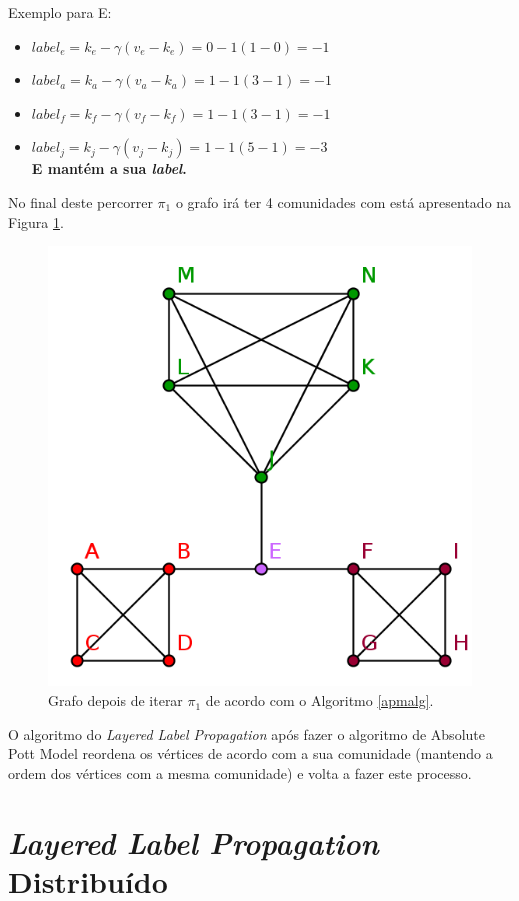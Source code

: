 \documentclass[a4paper,10pt]{report}
\begin{document}
  Exemplo para E:\\
  \begin{itemize}
   \item $label_e = k_e - \gamma ( v_e - k_e ) = 0 - 1 ( 1 - 0) = -1$
   \item $label_a = k_a - \gamma ( v_a - k_a ) = 1 - 1 ( 3 - 1) = -1$
   \item $label_f = k_f - \gamma ( v_f - k_f ) = 1 - 1 ( 3 - 1) = -1$ 
   \item $label_j = k_j - \gamma ( v_j - k_j ) = 1 - 1 ( 5 - 1) = -3$\\
   {\bf E mantém a sua \textit{label}.}
  \end{itemize}
  
  No final deste percorrer $\pi_1$ o grafo irá ter 4 comunidades com está apresentado na Figura \ref{graphfinalllp}.
  
  \begin{figure}[H]
    \center
    \includegraphics{graph_stepFinal.png}
    \caption{Grafo depois de iterar $\pi_1$ de acordo com o Algoritmo \ref{apmalg}.}
    \label{graphfinalllp}
  \end{figure}
  
  O algoritmo do \textit{Layered Label Propagation} após fazer o algoritmo de Absolute Pott Model reordena os vértices de acordo com a sua comunidade (mantendo a ordem dos vértices com a mesma comunidade) e volta a fazer este processo.
  
\section*{\textit{Layered Label Propagation} Distribuído}
  
  
\end{document}
